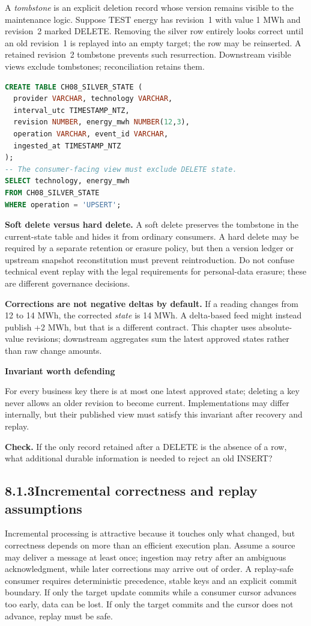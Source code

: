 \documentclass[11pt,twoside]{article}
\newcommand{\topic}[2]{\subsection*{#1\quad #2}}
\begin{document}
A \emph{tombstone} is an explicit deletion record whose version remains visible to the maintenance logic. Suppose TEST energy has revision~1 with value 1 MWh and revision~2 marked DELETE. Removing the silver row entirely looks correct until an old revision~1 is replayed into an empty target; the row may be reinserted. A retained revision~2 tombstone prevents such resurrection. Downstream visible views exclude tombstones; reconciliation retains them.
\begin{lstlisting}[language=SQL,caption={State representation, not a complete executable pipeline.}]
CREATE TABLE CH08_SILVER_STATE (
  provider VARCHAR, technology VARCHAR,
  interval_utc TIMESTAMP_NTZ,
  revision NUMBER, energy_mwh NUMBER(12,3),
  operation VARCHAR, event_id VARCHAR,
  ingested_at TIMESTAMP_NTZ
);
-- The consumer-facing view must exclude DELETE state.
SELECT technology, energy_mwh
FROM CH08_SILVER_STATE
WHERE operation = 'UPSERT';
\end{lstlisting}
\textbf{Soft delete versus hard delete.} A soft delete preserves the tombstone in the current-state table and hides it from ordinary consumers. A hard delete may be required by a separate retention or erasure policy, but then a version ledger or upstream snapshot reconstitution must prevent reintroduction. Do not confuse technical event replay with the legal requirements for personal-data erasure; these are different governance decisions.

\textbf{Corrections are not negative deltas by default.} If a reading changes from 12 to 14 MWh, the corrected \emph{state} is 14 MWh. A delta-based feed might instead publish +2 MWh, but that is a different contract. This chapter uses absolute-value revisions; downstream aggregates sum the latest approved states rather than raw change amounts.
\begin{insight}\textbf{Invariant worth defending}\par
For every business key there is at most one latest approved state; deleting a key never allows an older revision to become current. Implementations may differ internally, but their published view must satisfy this invariant after recovery and replay.\end{insight}
\textbf{Check.} If the only record retained after a DELETE is the absence of a row, what additional durable information is needed to reject an old INSERT?
\newpage
\topic{8.1.3}{Incremental correctness and replay assumptions}
Incremental processing is attractive because it touches only what changed, but correctness depends on more than an efficient execution plan. Assume a source may deliver a message at least once; ingestion may retry after an ambiguous acknowledgment, while later corrections may arrive out of order. A replay-safe consumer requires deterministic precedence, stable keys and an explicit commit boundary. If only the target update commits while a consumer cursor advances too early, data can be lost. If only the target commits and the cursor does not advance, replay must be safe.
\end{document}
